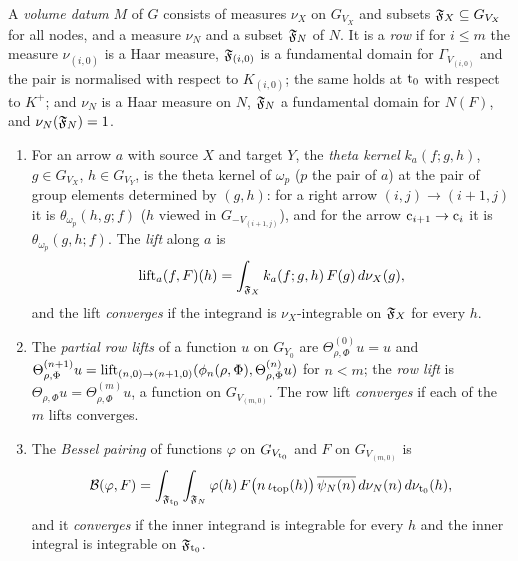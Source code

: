 \begin{definition}\label{pf:fs:vol}
A \emph{volume datum} $M$ of $G$ consists of measures $\nu_X$ on $G_{V_X}$ and subsets $\mathfrak F_X\subseteq G_{V_X}$ for all nodes, and
a measure $\nu_N$ and a subset $\mathfrak F_N$ of $N$. It is a \emph{row} if for $i\le m$ the measure $\nu_{(i,0)}$ is a Haar measure,
$\mathfrak F_{(i,0)}$ is a fundamental domain for $\Gamma_{V_{(i,0)}}$ and the pair is normalised with respect to $K_{(i,0)}$; the same
holds at $\mathrm{t}_0$ with respect to $K^+$; and $\nu_N$ is a Haar measure on $N$, $\mathfrak F_N$ a fundamental domain for $N(F)$, and
$\nu_N(\mathfrak F_N)=1$.
\begin{enumerate}[label=(\alph*)]
\item For an arrow $a$ with source $X$ and target $Y$, the \emph{theta kernel} $k_a(f;g,h)$, $g\in G_{V_X}$, $h\in G_{V_Y}$, is
the theta kernel of $\omega_p$ ($p$ the pair of $a$) at the pair of group elements determined by $(g,h)$: for a right arrow
$(i,j)\to(i+1,j)$ it is $\theta_{\omega_p}(h,g;f)$ ($h$ viewed in $G_{-V_{(i+1,j)}}$), and for the arrow
$\mathrm{c}_{i+1}\to\mathrm{c}_i$ it is $\theta_{\omega_p}(g,h;f)$. The \emph{lift} along $a$ is
\begin{equation}\label{eq:pf:fs:lift}
\mathrm{lift}_a(f,F)(h)=\int_{\mathfrak F_X}k_a(f;g,h)\,F(g)\,d\nu_X(g),
\end{equation}
and the lift \emph{converges} if the integrand is $\nu_X$-integrable on $\mathfrak F_X$ for every $h$.
\item The \emph{partial row lifts} of a function $u$ on $G_{Y_0}$ are
$\Theta^{(0)}_{\rho,\Phi}u=u$ and $\Theta^{(n+1)}_{\rho,\Phi}u=\mathrm{lift}_{(n,0)\to(n+1,0)}(\phi_n(\rho,\Phi),\Theta^{(n)}_{\rho,\Phi}u)$
for $n<m$; the \emph{row lift} is $\Theta_{\rho,\Phi}u=\Theta^{(m)}_{\rho,\Phi}u$, a function on $G_{V_{(m,0)}}$. The row lift
\emph{converges} if each of the $m$ lifts converges.
\item The \emph{Bessel pairing} of functions $\varphi$ on $G_{V_{\mathrm{t}_0}}$ and $F$ on $G_{V_{(m,0)}}$ is
\begin{equation}\label{eq:pf:fs:bessel}
\mathcal B(\varphi,F)=\int_{\mathfrak F_{\mathrm{t}_0}}\int_{\mathfrak F_N}\varphi(h)\,F\bigl(n\,\iota_{\mathrm{top}}(h)\bigr)\,\overline{\psi_N(n)}\,
d\nu_N(n)\,d\nu_{\mathrm{t}_0}(h),
\end{equation}
and it \emph{converges} if the inner integrand is integrable for every $h$ and the inner integral is integrable on
$\mathfrak F_{\mathrm{t}_0}$.
\end{enumerate}
\end{definition}

